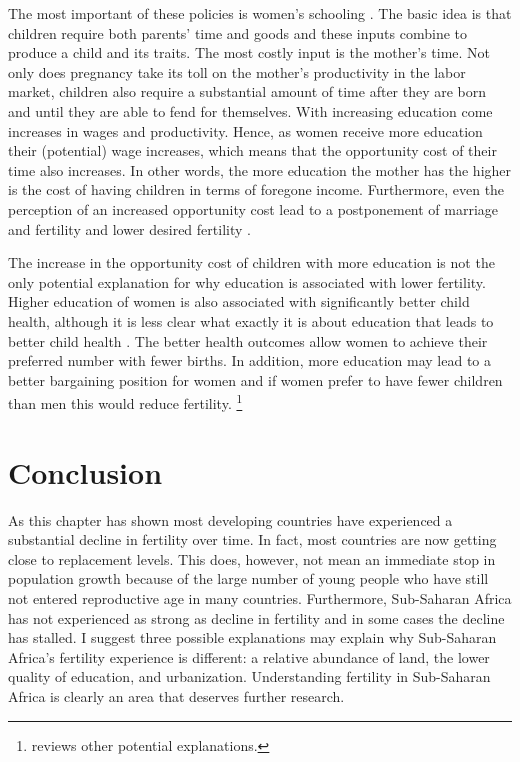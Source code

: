 \documentclass[letterpaper,12pt]{article}
\begin{document}
The most important of these policies is women's schooling
\citep{schultz02}.
The basic idea is that children require both parents' time and goods and
these inputs combine to produce a child and its traits.
The most costly input is the mother's time.
Not only does pregnancy take its toll on the mother's productivity in
the labor market, children also require a substantial amount of time
after they are born and until they are able to fend for themselves.
With increasing education come increases in wages and productivity.
Hence, as women receive more education their (potential) wage increases,
which means that the opportunity cost of their time also increases.
In other words, the more education the mother has the higher is the cost
of having children in terms of foregone income.
Furthermore, even the perception of an increased opportunity cost lead
to a postponement of marriage and fertility and lower desired fertility
\citep{Jensen2012}.

The increase in the opportunity cost of children with more education is
not the only potential explanation for why education is associated with
lower fertility.
Higher education of women is also associated with significantly better
child health, although it is less clear what exactly it is about
education that leads to better child health
\citep{Thomas1991,Glewwe1999,Kovsted2002}.
The better health outcomes allow women to achieve their preferred number
with fewer births.
In addition, more education may lead to a better bargaining position for
women and if women prefer to have fewer children than men this would
reduce fertility.%
\footnote{
\citet{Ainsworth1996} reviews other potential explanations.}

\section{Conclusion}

As this chapter has shown most developing countries have experienced
a substantial decline in fertility over time.
In fact, most countries are now getting close to replacement levels.
This does, however, not mean an immediate stop in population growth
because of the large number of young people who have still not
entered reproductive age in many countries.
Furthermore, Sub-Saharan Africa has not experienced as strong as
decline in fertility and in some cases the decline has stalled.
I suggest three possible explanations may explain why Sub-Saharan 
Africa's fertility experience is different: a relative abundance 
of land, the lower quality of education, and urbanization.
Understanding fertility in Sub-Saharan Africa is clearly
an area that deserves further research.
\end{document}
